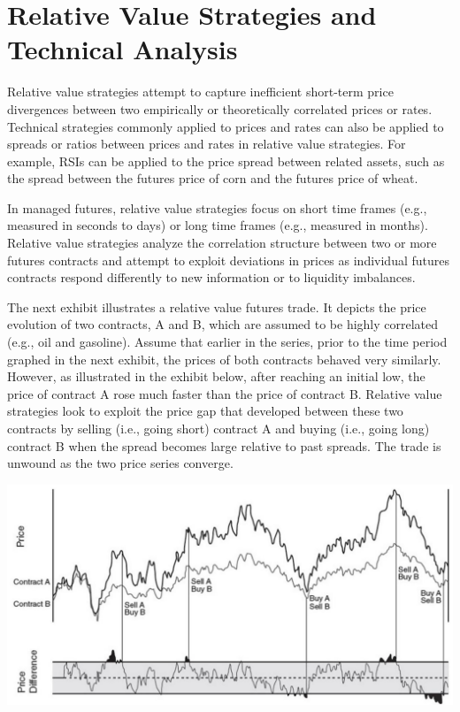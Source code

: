 \documentclass[11pt]{article}
\begin{document}
\section*{Relative Value Strategies and Technical Analysis}
Relative value strategies attempt to capture inefficient short-term price divergences between two empirically or theoretically correlated prices or rates. Technical strategies commonly applied to prices and rates can also be applied to spreads or ratios between prices and rates in relative value strategies. For example, RSIs can be applied to the price spread between related assets, such as the spread between the futures price of corn and the futures price of wheat.

In managed futures, relative value strategies focus on short time frames (e.g., measured in seconds to days) or long time frames (e.g., measured in months). Relative value strategies analyze the correlation structure between two or more futures contracts and attempt to exploit deviations in prices as individual futures contracts respond differently to new information or to liquidity imbalances.

The next exhibit illustrates a relative value futures trade. It depicts the price evolution of two contracts, A and B, which are assumed to be highly correlated (e.g., oil and gasoline). Assume that earlier in the series, prior to the time period graphed in the next exhibit, the prices of both contracts behaved very similarly. However, as illustrated in the exhibit below, after reaching an initial low, the price of contract A rose much faster than the price of contract B. Relative value strategies look to exploit the price gap that developed between these two contracts by selling (i.e., going short) contract A and buying (i.e., going long) contract B when the spread becomes large relative to past spreads. The trade is unwound as the two price series converge.

\begin{center}
\includegraphics[max width=\textwidth]{2024_04_09_5d84553069220c8df1d0g-08}
\end{center}
\end{document}

